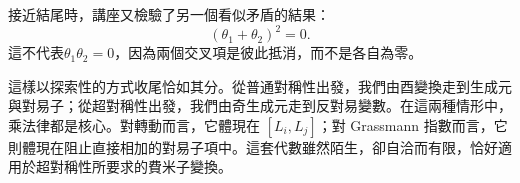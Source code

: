 接近結尾時，講座又檢驗了另一個看似矛盾的結果：
\begin{equation}
(\theta_1+\theta_2)^2=0.
\end{equation}
這不代表\(\theta_1\theta_2=0\)，因為兩個交叉項是彼此抵消，而不是各自為零。

\begin{classroomqa}
\end{classroomqa}

\begin{classroomqa}
\end{classroomqa}

這樣以探索性的方式收尾恰如其分。從普通對稱性出發，我們由酉變換走到生成元與對易子；從超對稱性出發，我們由奇生成元走到反對易變數。在這兩種情形中，乘法律都是核心。對轉動而言，它體現在 \([L_i,L_j]\)；對 Grassmann 指數而言，它則體現在阻止直接相加的對易子項中。這套代數雖然陌生，卻自洽而有限，恰好適用於超對稱性所要求的費米子變換。

